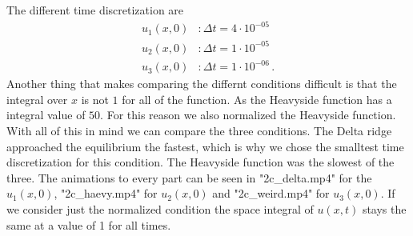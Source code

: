 \begin{itemize}
        The different time discretization are
        \begin{align}
            u_1(x,0) &: \Delta t = 4\cdot10^{-05}\\
            u_2(x,0) &: \Delta t = 1\cdot10^{-05}\\
            u_3(x,0) &: \Delta t = 1\cdot10^{-06}\,.
        \end{align}
        Another thing that makes comparing the differnt conditions difficult is that the integral over $x$ is not $1$ for all of the function.
        As the Heavyside function has a integral value of $50$.
        For this reason we also normalized the Heavyside function.
        With all of this in mind we can compare the three conditions.
        The Delta ridge approached the equilibrium the fastest, which is why we chose the smalltest time discretization for this condition.
        The Heavyside function was the slowest of the three.
        The animations to every part can be seen in "2c\_delta.mp4" for the $u_1(x,0)$, "2c\_haevy.mp4" for $u_2(x,0)$ and "2c\_weird.mp4" for $u_3(x,0)$.
        If we consider just the normalized condition the space integral of $u(x,t)$ stays the same at a value of 1 for all times.
    \end{itemize}